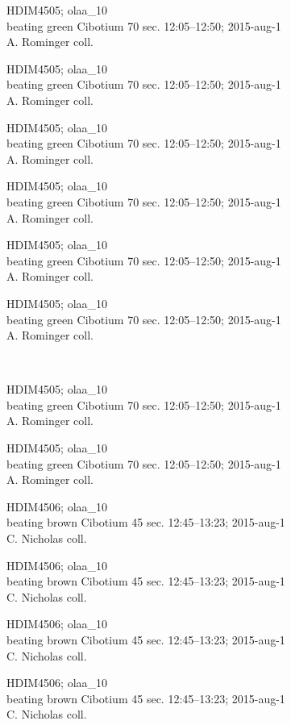 \documentclass[2pt]{extarticle}
\begin{document}
\noindent
\parbox{0.16\textwidth}{\tiny \raggedright \rule[-0.3\baselineskip]{0pt}{10pt}HDIM4505; olaa\_10\\ beating green Cibotium 70 sec. 12:05--12:50; 2015-aug-1\\ A. Rominger coll.}
\parbox{0.16\textwidth}{\tiny \raggedright \rule[-0.3\baselineskip]{0pt}{10pt}HDIM4505; olaa\_10\\ beating green Cibotium 70 sec. 12:05--12:50; 2015-aug-1\\ A. Rominger coll.}
\parbox{0.16\textwidth}{\tiny \raggedright \rule[-0.3\baselineskip]{0pt}{10pt}HDIM4505; olaa\_10\\ beating green Cibotium 70 sec. 12:05--12:50; 2015-aug-1\\ A. Rominger coll.}
\parbox{0.16\textwidth}{\tiny \raggedright \rule[-0.3\baselineskip]{0pt}{10pt}HDIM4505; olaa\_10\\ beating green Cibotium 70 sec. 12:05--12:50; 2015-aug-1\\ A. Rominger coll.}
\parbox{0.16\textwidth}{\tiny \raggedright \rule[-0.3\baselineskip]{0pt}{10pt}HDIM4505; olaa\_10\\ beating green Cibotium 70 sec. 12:05--12:50; 2015-aug-1\\ A. Rominger coll.}
\parbox{0.16\textwidth}{\tiny \raggedright \rule[-0.3\baselineskip]{0pt}{10pt}HDIM4505; olaa\_10\\ beating green Cibotium 70 sec. 12:05--12:50; 2015-aug-1\\ A. Rominger coll.} \\ 
\vspace{0.001in} 

\noindent
\parbox{0.16\textwidth}{\tiny \raggedright \rule[-0.3\baselineskip]{0pt}{10pt}HDIM4505; olaa\_10\\ beating green Cibotium 70 sec. 12:05--12:50; 2015-aug-1\\ A. Rominger coll.}
\parbox{0.16\textwidth}{\tiny \raggedright \rule[-0.3\baselineskip]{0pt}{10pt}HDIM4505; olaa\_10\\ beating green Cibotium 70 sec. 12:05--12:50; 2015-aug-1\\ A. Rominger coll.}
\parbox{0.16\textwidth}{\tiny \raggedright \rule[-0.3\baselineskip]{0pt}{10pt}HDIM4506; olaa\_10\\ beating brown Cibotium 45 sec. 12:45--13:23; 2015-aug-1\\ C. Nicholas coll.}
\parbox{0.16\textwidth}{\tiny \raggedright \rule[-0.3\baselineskip]{0pt}{10pt}HDIM4506; olaa\_10\\ beating brown Cibotium 45 sec. 12:45--13:23; 2015-aug-1\\ C. Nicholas coll.}
\parbox{0.16\textwidth}{\tiny \raggedright \rule[-0.3\baselineskip]{0pt}{10pt}HDIM4506; olaa\_10\\ beating brown Cibotium 45 sec. 12:45--13:23; 2015-aug-1\\ C. Nicholas coll.}
\parbox{0.16\textwidth}{\tiny \raggedright \rule[-0.3\baselineskip]{0pt}{10pt}HDIM4506; olaa\_10\\ beating brown Cibotium 45 sec. 12:45--13:23; 2015-aug-1\\ C. Nicholas coll.} \\ 
\vspace{0.001in} 
\end{document}
